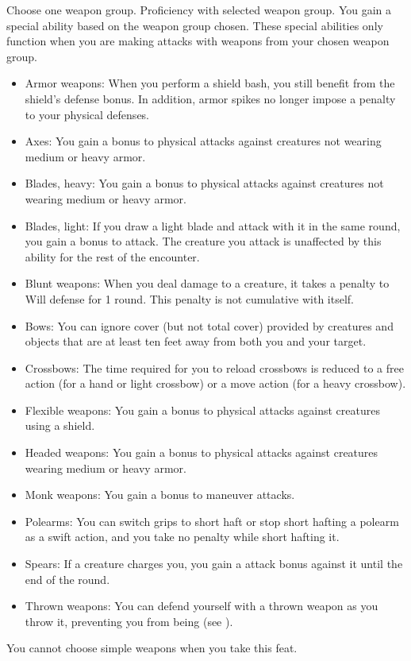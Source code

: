 Choose one weapon group.
\featpres
Proficiency with selected weapon group.
\featben You gain a special ability based on the weapon group chosen.
These special abilities only function when you are making attacks with weapons from your chosen weapon group.
\begin{itemize}
    \item Armor weapons: When you perform a shield bash, you still benefit from the shield's defense bonus.
        In addition, armor spikes no longer impose a penalty to your physical defenses.
    \item Axes: You gain a  bonus to physical attacks against creatures not wearing medium or heavy armor.
    \item Blades, heavy: You gain a  bonus to physical attacks against creatures not wearing medium or heavy armor.
    \item Blades, light: If you draw a light blade and attack with it in the same round, you gain a  bonus to attack.
        The creature you attack is unaffected by this ability for the rest of the encounter.
    \item Blunt weapons: When you deal damage to a creature, it takes a  penalty to Will defense for 1 round.
        This penalty is not cumulative with itself.
    \item Bows: You can ignore cover (but not total cover) provided by creatures and objects that are at least ten feet away from both you and your target.
    \item Crossbows: The time required for you to reload crossbows is reduced to a free action (for a hand or light crossbow) or a move action (for a heavy crossbow).
    \item Flexible weapons: You gain a  bonus to physical attacks against creatures using a shield.
    \item Headed weapons: You gain a  bonus to physical attacks against creatures wearing medium or heavy armor.
    \item Monk weapons: You gain a  bonus to maneuver attacks.
    \item Polearms: You can switch grips to short haft or stop short hafting a polearm as a swift action, and you take no penalty while short hafting it.
    \item Spears: If a creature charges you, you gain a  attack bonus against it until the end of the round.
    \item Thrown weapons: You can defend yourself with a thrown weapon as you throw it, preventing you from being  (see ).
\end{itemize}
You cannot choose simple weapons when you take this feat.

